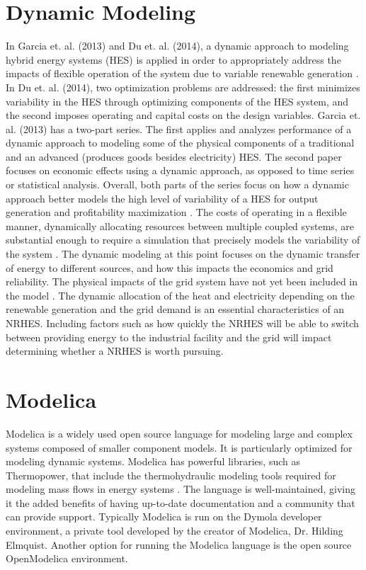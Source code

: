 \documentclass[12pt]{UIdahoMastersThesis}
\begin{document}
\section{Dynamic Modeling}
In Garcia et. al. (2013) and Du et. al. (2014), a dynamic approach to modeling hybrid energy systems (HES) is applied in order to appropriately address the impacts of flexible operation of the system due to variable renewable generation \cite{Garcia2013, Du2014}. In Du et. al. (2014), two optimization problems are addressed: the first minimizes variability in the HES through optimizing components of the HES system, and the second imposes operating and capital costs on the design variables. Garcia et. al. (2013) has a two-part series. The first applies and analyzes performance of a dynamic approach to modeling some of the physical components of a traditional and an advanced (produces goods besides electricity) HES. The second paper focuses on economic effects using a dynamic approach, as opposed to time series or statistical analysis. Overall, both parts of the series focus on how a dynamic approach better models the high level of variability of a HES for output generation and profitability maximization \cite{Garcia2013}. The costs of operating in a flexible manner, dynamically allocating resources between multiple coupled systems, are substantial enough to require a simulation that precisely models the variability of the system \cite{Garcia2013, Shropshire2011, Locatelli2015}. The dynamic modeling at this point focuses on the dynamic transfer of energy to different sources, and how this impacts the economics and grid reliability. The physical impacts of the grid system have not yet been included in the model \cite{Harrison2016}.  The dynamic allocation of the heat and electricity depending on the renewable generation and the grid demand is an essential characteristics of an NRHES.  Including factors such as how quickly the NRHES will be able to switch between providing energy to the industrial facility and the grid will impact determining whether a NRHES is worth pursuing. 

\section{Modelica}
Modelica is a widely used open source language for modeling large and complex systems composed of smaller component models. It is particularly optimized for modeling dynamic systems. Modelica has powerful libraries, such as Thermopower, that include the thermohydraulic modeling tools required for modeling mass flows in energy systems \cite{Binder2014}. The language is well-maintained, giving it the added benefits of having up-to-date documentation and a community that can provide support. Typically Modelica is run on the Dymola developer environment, a private tool developed by the creator of Modelica, Dr. Hilding Elmquist. Another option for running the Modelica language is the open source OpenModelica environment.
\end{document}
